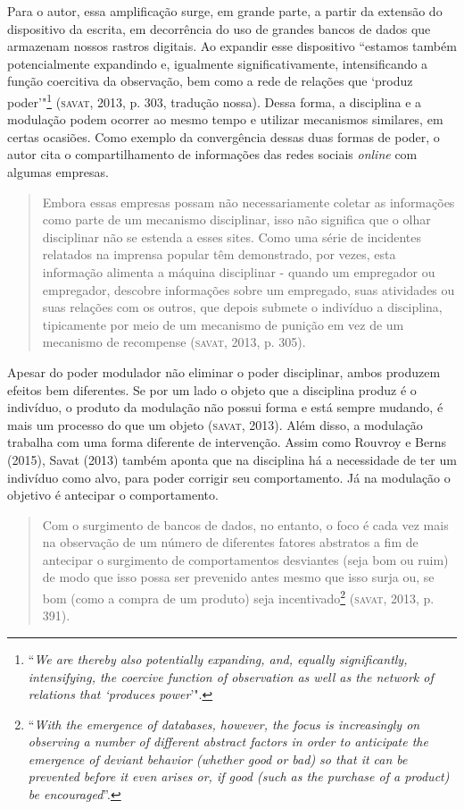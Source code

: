 Para o autor, essa amplificação surge, em grande parte, a partir da
extensão do dispositivo da escrita, em decorrência do uso de grandes
bancos de dados que armazenam nossos rastros digitais. Ao expandir esse
dispositivo ``estamos também potencialmente expandindo e, igualmente
significativamente, intensificando a função coercitiva da observação,
bem como a rede de relações que `produz poder'"\footnote{``\emph{We are
  thereby also potentially expanding, and, equally significantly,
  intensifying, the coercive function of observation as well as the
  network of relations that `produces power}'".}
(\textsc{savat}, 2013, p. 303, tradução nossa).
Dessa forma, a disciplina e a modulação podem ocorrer ao mesmo tempo e
utilizar mecanismos similares, em certas ocasiões. Como exemplo da
convergência dessas duas formas de poder, o autor cita o
compartilhamento de informações das redes sociais \emph{online} com algumas
empresas.

\begin{quote}
Embora essas empresas possam não necessariamente coletar as informações
como parte de um mecanismo disciplinar, isso não significa que o olhar
disciplinar não se estenda a esses sites. Como uma série de incidentes
relatados na imprensa popular têm demonstrado, por vezes, esta
informação alimenta a máquina disciplinar - quando um empregador ou
empregador, descobre informações sobre um empregado, suas atividades ou
suas relações com os outros, que depois submete o indivíduo a
disciplina, tipicamente por meio de um mecanismo de punição em vez de um
mecanismo de recompense (\textsc{savat}, 2013, p. 305).
\end{quote}

Apesar do poder modulador não eliminar o poder disciplinar, ambos
produzem efeitos bem diferentes. Se por um lado o objeto que a
disciplina produz é o indivíduo, o produto da modulação não possui forma
e está sempre mudando, é mais um processo do que um objeto
(\textsc{savat}, 2013). Além disso, a modulação trabalha com uma forma diferente de
intervenção. Assim como Rouvroy e Berns (2015), Savat (2013) também
aponta que na disciplina há a necessidade de ter um indivíduo como alvo,
para poder corrigir seu comportamento. Já na modulação o objetivo é
antecipar o comportamento.

\begin{quote}
Com o surgimento de bancos de dados, no entanto, o foco é cada vez mais
na observação de um número de diferentes fatores abstratos a fim de
antecipar o surgimento de comportamentos desviantes (seja bom ou ruim)
de modo que isso possa ser prevenido antes mesmo que isso surja ou, se
bom (como a compra de um produto) seja incentivado\footnote{``\emph{With the
  emergence of databases, however, the focus is increasingly on
  observing a number of different abstract factors in order to
  anticipate the emergence of deviant behavior (whether good or bad) so
  that it can be prevented before it even arises or, if good (such as
  the purchase of a product) be encouraged}''.}
(\textsc{savat}, 2013, p. 391).
\end{quote}

